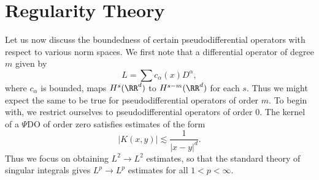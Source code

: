 


\section{Regularity Theory}

Let us now discuss the boundedness of certain pseudodifferential operators with respect to various norm spaces. We first note that a differential operator of degree $m$ given by
%
\[ L = \sum c_\alpha(x) D^\alpha, \]
%
where $c_\alpha$ is bounded, maps $H^s(\RR^d)$ to $H^{s-m}(\RR^d)$ for each $s$. Thus we might expect the same to be true for pseudodifferential operators of order $m$. To begin with, we restrict ourselves to pseudodifferential operators of order $0$. The kernel of a $\Psi$DO of order zero satisfies estimates of the form
%
\[ |K(x,y)| \lesssim \frac{1}{|x - y|^d}. \]
%
Thus we focus on obtaining $L^2 \to L^2$ estimates, so that the standard theory of singular integrals gives $L^p \to L^p$ estimates for all $1 < p < \infty$.

